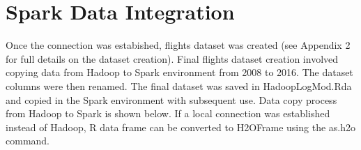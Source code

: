 \documentclass[12pt,twoside]{amherstthesis}
\begin{document}
  \begin{Shaded}
  \begin{Highlighting}[]
  \NormalTok{(} \NormalTok{)}
  
  \NormalTok{()}
  
  \NormalTok{()}
  
  \StringTok{ }\NormalTok{(} \NormalTok{)}
  \end{Highlighting}
  \end{Shaded}
  
  \section{Spark Data Integration}\label{spark-data-integration}
  
  Once the connection was estabished, flights dataset was created (see
  Appendix 2 for full details on the dataset creation). Final flights
  dataset creation involved copying data from Hadoop to Spark environment
  from 2008 to 2016. The dataset columns were then renamed. The final
  dataset was saved in HadoopLogMod.Rda and copied in the Spark
  environment with subsequent use. Data copy process from Hadoop to Spark
  is shown below. If a local connection was established instead of Hadoop,
  R data frame can be converted to H2OFrame using the as.h2o command.
  
  \begin{Shaded}
  \begin{Highlighting}[]
  \NormalTok{(}\NormalTok{)}
  \NormalTok{(}\NormalTok{)}
  \StringTok{ }\NormalTok{FullDatLog[}\NormalTok{(}
                                \NormalTok{, } \NormalTok{, }
                                 \NormalTok{),]}
  \StringTok{ }\NormalTok{, }
                         \NormalTok{)  }
  
  
  \StringTok{ } 
  \StringTok{ }
  \end{Highlighting}
  \end{Shaded}
  
\end{document}
